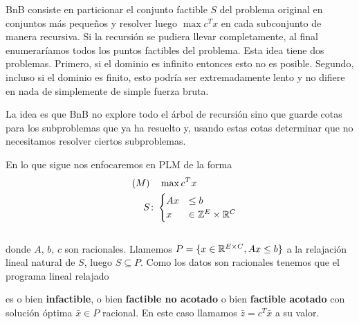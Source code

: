     BnB consiste en particionar el conjunto factible $S$ del problema original en conjuntos más pequeños y resolver luego $\max c^Tx$ en cada subconjunto de manera recursiva. Si la recursión se pudiera llevar completamente, al final  enumeraríamos todos los puntos factibles del problema. Esta idea tiene dos problemas. Primero, si el dominio es infinito entonces esto no es posible. Segundo, incluso si el dominio es finito, esto podría ser extremadamente lento y no difiere en nada de simplemente de simple fuerza bruta. 

    La idea es que BnB no explore todo el árbol de recursión sino que guarde cotas para los subproblemas que ya ha resuelto y, usando estas cotas determinar que no necesitamos resolver ciertos subproblemas. 
    
    En lo que sigue nos enfocaremos en PLM de la forma    
$$\begin{aligned}
    \qquad (M)&\quad \max c^Tx \\
    S&\colon \begin{cases}
    Ax &\leq b\\
    x &\in \mathbb Z^E\times \mathbb R^C
    \end{cases}\quad
    \end{aligned}$$\\[5pt]
    donde $A$, $b$, $c$ son racionales. Llamemos $P=\{x\in \mathbb R^{E\times C}, Ax\leq b\}$ a la relajación lineal natural de $S$, luego $S \subseteq P.$  Como los datos son racionales tenemos que el programa lineal relajado 
        
    es o bien \textbf{infactible}, o bien \textbf{factible no acotado} o bien \textbf{factible acotado} con solución óptima $\bar{x}\in P$ racional. En este caso llamamos $\bar{z}=c^T\bar{x}$ a su valor.
    
